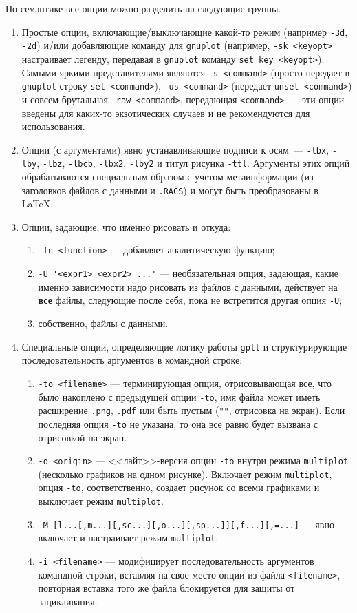 \documentclass[12pt]{article}
\def\gplt{{\tt gplt}}
\def\gnuplot{{\tt gnuplot}}
\def\png{{\tt .png}}
\def\pdf{{\tt .pdf}}
\begin{document}
По семантике все опции можно разделить на следующие группы.
\begin{enumerate}
\item Простые опции, включающие/выключающие какой-то режим (например \verb'-3d', \verb'-2d')
  и/или добавляющие команду для \gnuplot{} (например, \verb'-sk <keyopt>' настраивает легенду, передавая в \gnuplot{} команду \verb'set key <keyopt>').
  Самыми яркими представителями являются \verb'-s <command>' (просто передает в \gnuplot{} строку \verb'set <command>'),
  \verb'-us <command>' (передает \verb'unset <command>') и совсем брутальная \verb'-raw <command>', передающая \verb'<command>'~---
  эти опции введены для каких-то экзотических случаев и не рекомендуются для использования. 
\item Опции (с аргументами) явно устанавливающие подписи к осям~--- \verb'-lbx', \verb'-lby', \verb'-lbz', \verb'-lbcb', \verb'-lbx2', \verb'-lby2'
  и титул рисунка \verb'-ttl'. Аргументы этих опций обрабатываются специальным образом с учетом метаинформации (из заголовков файлов с данными и \verb'.RACS') и
  могут быть преобразованы в \LaTeX{}.
\item Опции, задающие, что именно рисовать и откуда:
  \begin{enumerate}
  \item \verb'-fn <function>' --- добавляет аналитическую функцию;
  \item \verb|-U '<expr1> <expr2> ...'| --- необязательная опция, задающая, какие именно зависимости надо рисовать из файлов с данными, действует на {\bf все} файлы,
    следующие после себя, пока не встретится другая опция \verb'-U';
  \item собственно, файлы с данными. 
  \end{enumerate}
\item Специальные опции, определяющие логику работы \gplt{} и структурирующие последовательность аргументов в командной строке:
  \begin{enumerate}
  \item \verb'-to <filename>' --- терминирующая опция, отрисовывающая все, что было накоплено с предыдущей опции \verb'-to', имя файла может иметь расширение \png, \pdf{}
    или быть пустым (\verb|""|, отрисовка на экран). Если последняя опция \verb'-to' не указана, то она все равно будет вызвана с отрисовкой на экран.
  \item \verb'-o <origin>' --- <<лайт>>-версия опции \verb'-to' внутри режима \verb'multiplot' (несколько графиков на одном рисунке). Включает режим
    \verb'multiplot', опция \verb'-to', соответственно, создает рисунок со всеми графиками и выключает режим \verb'multiplot'.
  \item \verb'-M [l...[,m...][,sc...][,o...][,sp...]][,f...][,=...]' --- явно включает и настраивает режим \verb'multiplot'.
  \item\verb'-i <filename>' --- модифицирует последовательность аргументов командной строки, вставляя на свое место опции из файла \verb'<filename>',
    повторная вставка того же файла блокируется для защиты от зацикливания.
  \end{enumerate}
\end{enumerate}
\end{document}
